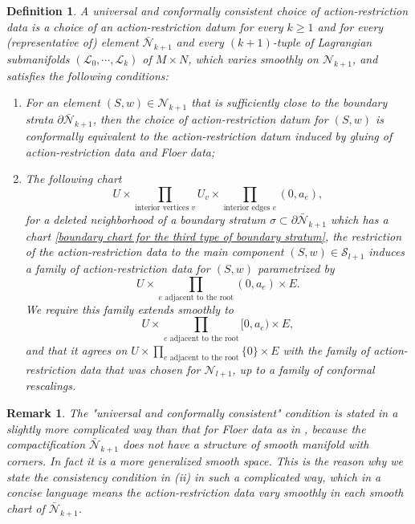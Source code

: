 \documentclass{amsart}
\newtheorem{definition}[theorem]{Definition}
\newtheorem{remark}[theorem]{Remark}
\numberwithin{equation}{section}
\numberwithin{figure}{section}
\begin{document}
\begin{definition}
	A universal and conformally consistent choice of action-restriction data is a choice of an action-restriction datum for every $k \ge 1$ and for every (representative of) element $\bar{\mathcal{N}}_{k+1}$ and every $(k+1)$-tuple of Lagrangian submanifolds $(\mathcal{L}_{0}, \cdots, \mathcal{L}_{k})$ of $M \times N$, which varies smoothly on $\mathcal{N}_{k+1}$, and satisfies the following conditions:
\begin{enumerate}[label=(\roman*)]

\item For an element $(S, w) \in \mathcal{N}_{k+1}$ that is sufficiently close to the boundary strata $\partial \bar{\mathcal{N}}_{k+1}$, then the choice of action-restriction datum for $(S, w)$ is conformally equivalent to the action-restriction datum induced by gluing of action-restriction data and Floer data;

\item The following chart
\begin{equation}\label{deleted neighborhood of the boundary chart for the third type of boundary stratum}
U \times \prod_{\text{interior vertices } v} U_{v} \times \prod_{\text{interior edges } e} (0, a_{e}),
\end{equation}
for a deleted neighborhood of a boundary stratum $\sigma \subset \partial \bar{\mathcal{N}}_{k+1}$ which has a chart \eqref{boundary chart for the third type of boundary stratum}, the restriction of the action-restriction data to the main component $(S, w) \in \mathcal{S}_{l+1}$ induces a family of action-restriction data for $(S, w)$ parametrized by
\begin{equation*}
U \times \prod_{e \text{ adjacent to the root}} (0, a_{e}) \times E.
\end{equation*}
We require this family extends smoothly to
\begin{equation*}
U \times \prod_{e \text{ adjacent to the root}} [0, a_{e}) \times E,
\end{equation*}
and that it agrees on $U \times \prod_{e \text{ adjacent to the root}} \{0\} \times E$ with the family of action-restriction data that was chosen for $\mathcal{N}_{l+1}$, up to a family of conformal rescalings.

\end{enumerate}

\end{definition}

\begin{remark}
	The "universal and conformally consistent" condition is stated in a slightly more complicated way than that for Floer data as in \cite{Abouzaid1}, because the compactification $\bar{\mathcal{N}}_{k+1}$ does not have a structure of smooth manifold with corners. In fact it is a more generalized smooth space. This is the reason why we state the consistency condition in (ii) in such a complicated way, which in a concise language means the action-restriction data vary smoothly in each smooth chart of $\bar{\mathcal{N}}_{k+1}$.
\end{remark}
\end{document}
